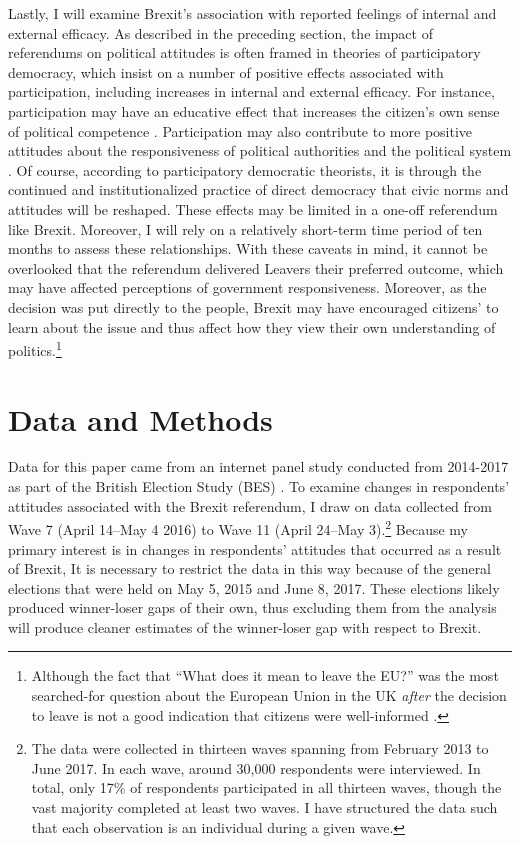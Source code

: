 \documentclass[12pt, letter]{article}
\begin{document}
Lastly, I will examine Brexit's association with reported feelings of internal and external efficacy. As described in the preceding section, the impact of referendums on political attitudes is often framed in theories of participatory democracy, which insist on a number of positive effects associated with participation, including increases in internal and external efficacy. For instance, participation may have an educative effect that increases the citizen's own sense of political competence \parencite{pateman1970participation, barber2003strong}. Participation may also contribute to more positive attitudes about the responsiveness of political authorities and the political system \parencite{finkel1985reciprocal}. Of course, according to participatory democratic theorists, it is through the continued and institutionalized practice of direct democracy that civic norms and attitudes will be reshaped. These effects may be limited in a one-off referendum like Brexit. Moreover, I will rely on a relatively short-term time period of ten months to assess these relationships. With these caveats in mind, it cannot be overlooked that the referendum delivered Leavers their preferred outcome, which may have affected perceptions of government responsiveness. Moreover, as the decision was put directly to the people, Brexit may have encouraged citizens' to learn about the issue and thus affect how they view their own understanding of politics.\footnote{Although the fact that ``What does it mean to leave the EU?'' was the most searched-for question about the European Union in the UK \textit{after} the decision to leave is not a good indication that citizens were well-informed \parencite{selyukh2016after}.}



\singlespacing
\section{Data and Methods}
\doublespacing


Data for this paper came from an internet panel study conducted from 2014-2017 as part of the British Election Study (BES) \parencite{bespanel}. To examine changes in respondents' attitudes associated with the Brexit referendum, I draw on data collected from Wave 7 (April 14--May 4 2016) to Wave 11 (April 24--May 3).\footnote{The data were collected in thirteen waves spanning from February 2013 to June 2017. In each wave, around 30,000 respondents were interviewed. In total, only 17\% of respondents participated in all thirteen waves, though the vast majority completed at least two waves. I have structured the data such that each observation is an individual during a given wave.} Because my primary interest is in changes in respondents' attitudes that occurred as a result of Brexit,  It is necessary to restrict the data in this way because of the general elections that were held on May 5, 2015 and June 8, 2017. These elections likely produced winner-loser gaps of their own, thus excluding them from the analysis will produce cleaner estimates of the winner-loser gap with respect to Brexit. 
\end{document}
